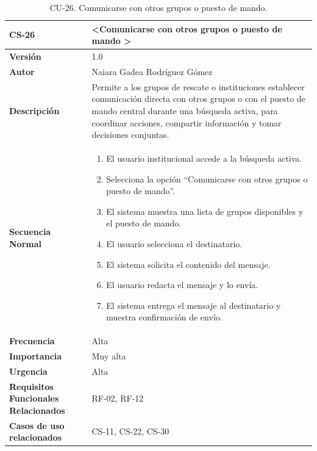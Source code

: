\begin{table}[htbp] %
\centering
\begin{tabular}{ |m{3cm}|m{11cm}|  } 
\hline
\cellcolor[HTML]{B9E3F0}\centering\textbf{CS-26} & \cellcolor[HTML]{B9E3F0}\textbf{\textless Comunicarse con otros grupos o puesto de mando \textgreater}\\

\hline
\cellcolor[HTML]{EFEFEF}\textbf{Versión}             & 1.0  \\
\hline
\cellcolor[HTML]{EFEFEF}\textbf{Autor}                & Naiara Gadea Rodríguez Gómez\\
\hline
\cellcolor[HTML]{EFEFEF}\textbf{Descripción}                & {Permite a los grupos de rescate o instituciones establecer comunicación directa con otros grupos o con el puesto de mando central durante una búsqueda activa, para coordinar acciones, compartir información y tomar decisiones conjuntas.}\\
\hline
\cellcolor[HTML]{EFEFEF}\textbf{Secuencia \newline Normal}                &                 
        \begin{enumerate}
			\item El usuario institucional accede a la búsqueda activa.
			\item Selecciona la opción “Comunicarse con otros grupos o puesto de mando”.
			\item El sistema muestra una lista de grupos disponibles y el puesto de mando.
			\item El usuario selecciona el destinatario.
			\item El sistema solicita el contenido del mensaje.
			\item El usuario redacta el mensaje y lo envía.
			\item El sistema entrega el mensaje al destinatario y muestra confirmación de envío.
		\end{enumerate}\\
\hline
\cellcolor[HTML]{EFEFEF}\textbf{Frecuencia}                & Alta\\
\hline
\cellcolor[HTML]{EFEFEF}\textbf{Importancia}                & Muy alta\\
\hline
\cellcolor[HTML]{EFEFEF}\textbf{Urgencia}                & Alta\\
\hline
\cellcolor[HTML]{EFEFEF}\textbf{Requisitos Funcionales Relacionados}                & {RF-02, RF-12}\\
\hline
\cellcolor[HTML]{EFEFEF}\textbf{Casos de uso relacionados}                & {CS-11, CS-22, CS-30}\\
\hline
\end{tabular}
\caption{CU-26. Comunicarse con otros grupos o puesto de mando.}
\end{table}

